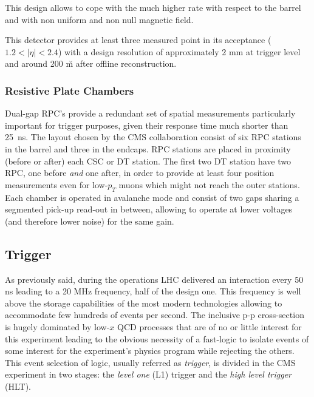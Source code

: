 This design allows to cope with the much higher rate with respect to the barrel and with non uniform and non null magnetic field. 

This detector provides at least three measured point in its acceptance ($1.2 < |\eta| < 2.4$) with a design resolution of approximately 2 mm at trigger level and around 200 \u m after offline reconstruction.

\subsubsection*{Resistive Plate Chambers}

Dual-gap RPC's provide a redundant set of spatial measurements particularly important for trigger purposes, given their response time much shorter than 25~ns. The layout chosen by the CMS collaboration consist of six RPC stations in the barrel and three in the endcaps. RPC stations are placed in proximity (before or after) each CSC or DT station. The first two DT station have two RPC, one before \emph{and} one after, in order to provide at least four position measurements even for low-$p_T$ muons which might not reach the outer stations. Each chamber is operated in avalanche mode and consist of two gaps sharing a segmented pick-up read-out in between, allowing to operate at lower voltages (and therefore lower noise) for the same gain. 

\subsection{Trigger}

As previously said, during the operations LHC delivered an interaction every 50 ns leading to a 20 MHz frequency, half of the design one.
This frequency is well above the storage capabilities of the most modern technologies allowing to accommodate few hundreds of events per second. The inclusive p-p cross-section is hugely dominated by low-$x$ QCD processes that are of no or little interest for this experiment leading to the obvious necessity of a fast-logic to isolate events of some interest for the experiment's physics program while rejecting the others. This event selection of logic, usually referred as \emph{trigger}, is divided in the CMS experiment in two stages: the \emph{level one} (L1) trigger and the \emph{high level trigger} (HLT). 

